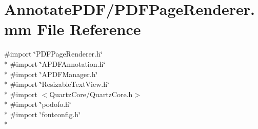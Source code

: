 \hypertarget{_p_d_f_page_renderer_8mm}{\section{Annotate\-P\-D\-F/\-P\-D\-F\-Page\-Renderer.mm File Reference}
\label{_p_d_f_page_renderer_8mm}
}
{\ttfamily \#import \char`\"{}P\-D\-F\-Page\-Renderer.\-h\char`\"{}}\\*
{\ttfamily \#import \char`\"{}A\-P\-D\-F\-Annotation.\-h\char`\"{}}\\*
{\ttfamily \#import \char`\"{}A\-P\-D\-F\-Manager.\-h\char`\"{}}\\*
{\ttfamily \#import \char`\"{}Resizable\-Text\-View.\-h\char`\"{}}\\*
{\ttfamily \#import $<$Quartz\-Core/\-Quartz\-Core.\-h$>$}\\*
{\ttfamily \#import \char`\"{}podofo.\-h\char`\"{}}\\*
{\ttfamily \#import \char`\"{}fontconfig.\-h\char`\"{}}\\*
